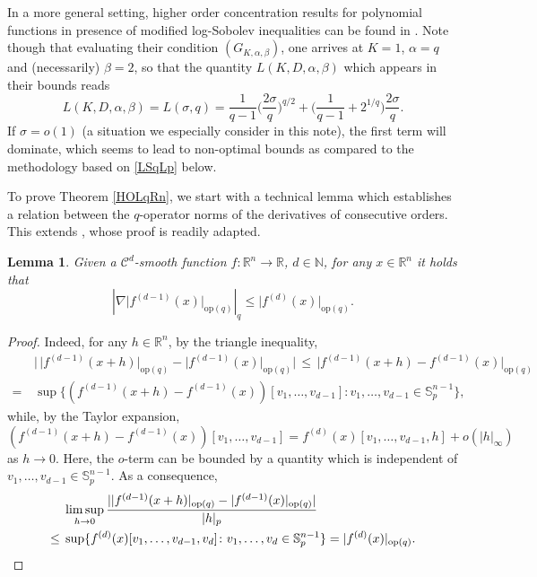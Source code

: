 \documentclass[a4paper,12pt]{amsart}
\numberwithin{equation}{section}
\newtheorem{lemma}[satz]{Lemma}
\theoremstyle{remark}
\def\R{{\mathbb R}}
\def\S{{\mathbb S}}
\begin{document}
In a more general setting, higher order concentration results for polynomial functions in presence of modified log-Sobolev inequalities can be found in \cite[Th.\ 3.12]{ABW17}. Note though that evaluating their condition $(G_{K,\alpha,\beta})$, one arrives at $K=1$, $\alpha=q$ and (necessarily) $\beta=2$, so that the quantity $L(K,D,\alpha,\beta)$ which appears in their bounds reads
\[
L(K,D,\alpha,\beta) = L(\sigma,q) = \frac{1}{q-1}\Big(\frac{2\sigma}{q}\Big)^{q/2} + \Big(\frac{1}{q-1} + 2^{1/q}\Big) \frac{2\sigma}{q}.
\]
If $\sigma = o(1)$ (a situation we especially consider in this note), the first term will dominate, which seems to lead to non-optimal bounds as compared to the methodology based on \eqref{LSqLp} below. 

To prove Theorem \ref{HOLqRn}, we start with a technical lemma which establishes a relation between the $q$-operator norms of the derivatives of consecutive orders. This extends \cite[Lem.\ 4.1]{BGS19}, whose proof is readily adapted.

\begin{lemma}
\label{itGradHess}
Given a $\mathcal{C}^d$-smooth function $f \colon \R^n \to \mathbb{R}$, $d \in \mathbb{N}$, for any $x \in \R^n$ it holds that
\[
|\nabla \lvert f^{(d-1)}(x) \rvert_{\mathrm{op}(q)}|_q \le 
\lvert f^{(d)}(x) \rvert_{\mathrm{op}(q)}.
\]
\end{lemma}

\begin{proof}
Indeed, for any $h \in \mathbb{R}^n$, by the triangle inequality,
\begin{align*}
 & 
\big|\,\lvert f^{(d-1)}(x+h) \rvert_{\mathrm{op}(q)} - 
\lvert f^{(d-1)}(x) \rvert_{\mathrm{op}(q)}\big|
 \, \le \,
\lvert f^{(d-1)}(x+h) - f^{(d-1)}(x) \rvert_{\mathrm{op}(q)}\\
 = \, &
\sup \{ (f^{(d-1)}(x+h) - f^{(d-1)}(x))[v_1, \ldots, v_{d-1}] 
\colon v_1, \ldots, v_{d-1} \in \S_p^{n-1} \},
\end{align*}
while, by the Taylor expansion,
$$
(f^{(d-1)}(x+h) - f^{(d-1)}(x))[v_1, \ldots, v_{d-1}] = 
f^{(d)}(x)[v_1, \ldots, v_{d-1}, h] + o(|h|_\infty)
$$
as $h \to 0$. Here, the $o$-term can be bounded by a quantity which is 
independent of $v_1, \ldots, v_{d-1} \in \S_p^{n-1}$. As a consequence,
\begin{align*}
 &
\limsup_{h \to 0} 
\frac{|\lvert f^{(d-1)}(x+h) \rvert_{\mathrm{op}(q)} - \lvert f^{(d-1)}(x) \rvert_{\mathrm{op}(q)}|}{|h|_p}\\
 \le \; &\sup \{ f^{(d)}(x)[v_1, \ldots, v_{d-1}, v_d] \colon v_1, \ldots, v_d \in \S_p^{n-1}\}
 = \lvert f^{(d)}(x) \rvert_{\mathrm{op}(q)}.\qedhere
\end{align*}
\end{proof}
\end{document}
